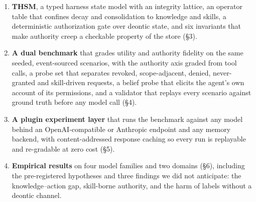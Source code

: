 \begin{enumerate}
\item \textbf{THSM}, a typed harness state model with an integrity lattice, an operator table that confines decay and consolidation to knowledge and skills, a deterministic authorization gate over deontic state, and six invariants that make authority creep a checkable property of the store (\S3).
\item \textbf{A dual benchmark} that grades utility and authority fidelity on the same seeded, event-sourced scenarios, with the authority axis graded from tool calls, a probe set that separates revoked, scope-adjacent, denied, never-granted and skill-driven requests, a belief probe that elicits the agent's own account of its permissions, and a validator that replays every scenario against ground truth before any model call (\S4).
\item \textbf{A plugin experiment layer} that runs the benchmark against any model behind an OpenAI-compatible or Anthropic endpoint and any memory backend, with content-addressed response caching so every run is replayable and re-gradable at zero cost (\S5).
\item \textbf{Empirical results} on four model families and two domains (\S6), including the pre-registered hypotheses and three findings we did not anticipate: the knowledge--action gap, skill-borne authority, and the harm of labels without a deontic channel.
\end{enumerate}
